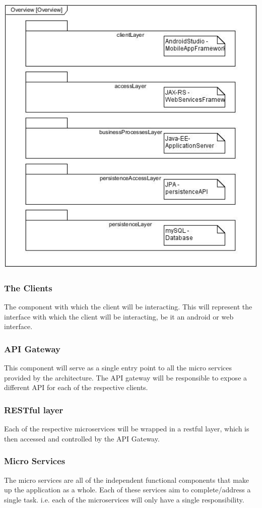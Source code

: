 \documentclass[a4paper,12pt]{article}
\begin{document}
	\includegraphics[width=1\textwidth]{./Pictures/UML/architectureOverview.jpg}\\[1.5cm]
	
	
	\subsubsection{The Clients}
	The component with which the client will be interacting. This will represent the interface with which the client will be interacting, be it an android or web interface.
	\subsubsection{API Gateway}
	This component will serve as a single entry point to all the micro services provided by the architecture. The API gateway will be responsible to expose a different API for each of the respective clients. 
	\subsubsection{RESTful layer}
	Each of the respective microservices will be wrapped in a restful layer, which is then accessed and controlled by the API Gateway. 
	\subsubsection{Micro Services}
	The micro services are all of the independent functional components that make up the application as a whole. Each of these services aim to complete/address a single task. i.e. each of the microservices will only have a single responsibility. 
\end{document}
